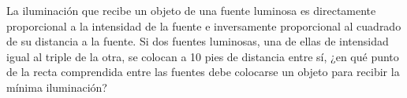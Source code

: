 \item La iluminación que recibe un objeto de una fuente luminosa es directamente proporcional a la intensidad de la fuente e inversamente proporcional al cuadrado de su distancia a la fuente. Si dos fuentes luminosas, una de ellas de intensidad igual al triple de la otra, se colocan a 10 pies de distancia entre sí, ¿en qué punto de la recta comprendida entre las fuentes debe colocarse un objeto para recibir la mínima iluminación?
